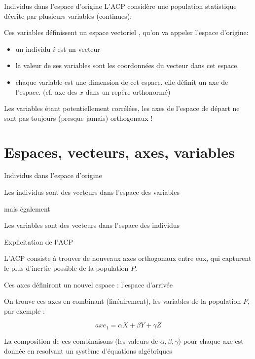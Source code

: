 \documentclass{beamer}
\begin{document}
\begin{frame}{Individus dans l'espace d'origine}
L'ACP considère une population statistique décrite par plusieurs variables (continues).


Ces variables définissent un \alert{espace vectoriel} , qu'on va appeler l'espace d'\alert{origine}: 
\begin{itemize}
	\item un individu $i$ est un \alert{vecteur}
	\item la valeur de ses variables sont les \alert{coordonnées} du vecteur dans cet espace. 
	\item chaque variable est une \alert{dimension} de cet espace. elle définit un \alert{axe} de l'espace. (cf. axe des $x$ dans un repère orthonormé)
\end{itemize}

Les variables étant potentiellement \alert{corrélées}, les axes de l'espace de départ ne sont pas toujours (presque jamais) orthogonaux ! 


\end{frame}



\section{Espaces, vecteurs, axes, variables}


\begin{frame}{Individus dans l'espace d'origine}

Les individus sont des vecteurs dans l'espace des variables 


\medskip mais également \medskip

Les variables sont des vecteurs dans l'espace des individus 


\end{frame}





\begin{frame}{Explicitation de l'ACP}


L'ACP consiste à trouver de  \alert{nouveaux axes orthogonaux entre eux}, qui capturent le \alert{plus d'inertie possible} de la population $P$.


Ces axes définiront un nouvel espace : l'\alert{espace d'arrivée}


On trouve ces axes en combinant (linéairement), les variables de la population $P$, par exemple :

$$ axe_1 = \alpha X + \beta Y + \gamma Z $$ 

La composition de ces combinaisons (les valeurs de $\alpha, \beta, \gamma$) pour chaque axe est donnée en resolvant un système d'équations algébriques 
\end{frame}
\end{document}

